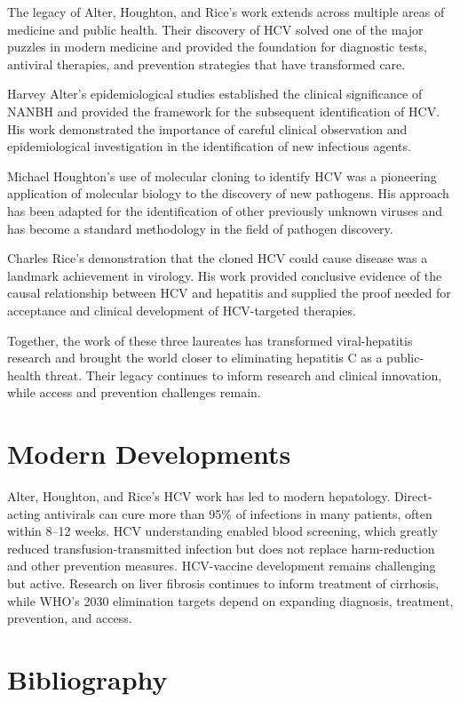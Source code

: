 The legacy of Alter, Houghton, and Rice's work extends across multiple areas of medicine and public health. Their discovery of HCV solved one of the major puzzles in modern medicine and provided the foundation for diagnostic tests, antiviral therapies, and prevention strategies that have transformed care.

Harvey Alter's epidemiological studies established the clinical significance of NANBH and provided the framework for the subsequent identification of HCV. His work demonstrated the importance of careful clinical observation and epidemiological investigation in the identification of new infectious agents.

Michael Houghton's use of molecular cloning to identify HCV was a pioneering application of molecular biology to the discovery of new pathogens. His approach has been adapted for the identification of other previously unknown viruses and has become a standard methodology in the field of pathogen discovery.

Charles Rice's demonstration that the cloned HCV could cause disease was a landmark achievement in virology. His work provided conclusive evidence of the causal relationship between HCV and hepatitis and supplied the proof needed for acceptance and clinical development of HCV-targeted therapies.

Together, the work of these three laureates has transformed viral-hepatitis research and brought the world closer to eliminating hepatitis C as a public-health threat. Their legacy continues to inform research and clinical innovation, while access and prevention challenges remain.


\section{Modern Developments}

Alter, Houghton, and Rice's HCV work has led to modern hepatology. Direct-acting antivirals can cure more than 95\% of infections in many patients, often within 8--12 weeks. HCV understanding enabled blood screening, which greatly reduced transfusion-transmitted infection but does not replace harm-reduction and other prevention measures. HCV-vaccine development remains challenging but active. Research on liver fibrosis continues to inform treatment of cirrhosis, while WHO's 2030 elimination targets depend on expanding diagnosis, treatment, prevention, and access.


\section{Bibliography}

